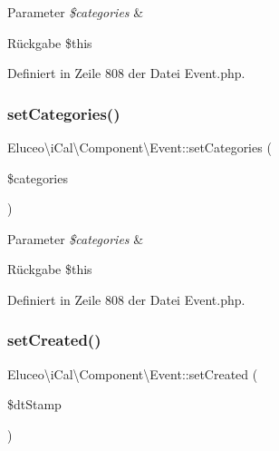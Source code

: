 \begin{DoxyParams}{Parameter}
{\em \$categories} & \\
\hline
\end{DoxyParams}
\begin{DoxyReturn}{Rückgabe}
\$this 
\end{DoxyReturn}


Definiert in Zeile 808 der Datei Event.\+php.

\mbox{\label{class_eluceo_1_1i_cal_1_1_component_1_1_event_ab8e1826d0bbfa8741667e0c9c06ac186}} 
\subsubsection{\texorpdfstring{set\+Categories()}{setCategories()}\hspace{0.1cm}{\footnotesize\ttfamily [3/3]}}
{\footnotesize\ttfamily Eluceo\textbackslash{}i\+Cal\textbackslash{}\+Component\textbackslash{}\+Event\+::set\+Categories (\begin{DoxyParamCaption}\item[{}]{\$categories }\end{DoxyParamCaption})}


\begin{DoxyParams}{Parameter}
{\em \$categories} & \\
\hline
\end{DoxyParams}
\begin{DoxyReturn}{Rückgabe}
\$this 
\end{DoxyReturn}


Definiert in Zeile 808 der Datei Event.\+php.

\mbox{\label{class_eluceo_1_1i_cal_1_1_component_1_1_event_a8a9ac44bf639ae275bebae3ad22eb238}} 
\subsubsection{\texorpdfstring{set\+Created()}{setCreated()}\hspace{0.1cm}{\footnotesize\ttfamily [1/3]}}
{\footnotesize\ttfamily Eluceo\textbackslash{}i\+Cal\textbackslash{}\+Component\textbackslash{}\+Event\+::set\+Created (\begin{DoxyParamCaption}\item[{}]{\$dt\+Stamp }\end{DoxyParamCaption})}


